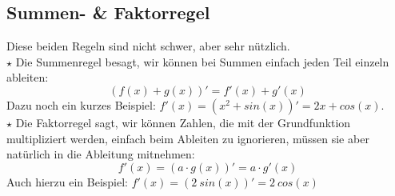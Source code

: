 \subsection{Summen- \& Faktorregel}
Diese beiden Regeln sind nicht schwer, aber sehr nützlich.\\
\(\star\) Die Summenregel besagt, wir können bei Summen einfach jeden Teil einzeln ableiten:
\[(f(x)+g(x))'=f'(x)+g'(x)\]
Dazu noch ein kurzes Beispiel: \(f'(x)=(x^2+sin(x))'=2x+cos(x)\).\\
\(\star\) Die Faktorregel sagt, wir können Zahlen, die mit der Grundfunktion multipliziert werden, einfach beim Ableiten zu ignorieren, müssen sie aber natürlich in die Ableitung mitnehmen:
\[f'(x)=(a\cdot g(x))'=a\cdot g'(x)\]
Auch hierzu ein Beispiel: \(f'(x)=(2\ sin(x))'=2\ cos(x)\)
